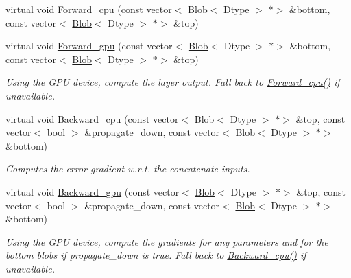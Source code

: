 \begin{DoxyCompactItemize}
virtual void \mbox{\hyperlink{classcaffe_1_1_concat_layer_ab2e03afe654f6b4240086e30ff4efdd8}{Forward\+\_\+cpu}} (const vector$<$ \mbox{\hyperlink{classcaffe_1_1_blob}{Blob}}$<$ Dtype $>$ $\ast$$>$ \&bottom, const vector$<$ \mbox{\hyperlink{classcaffe_1_1_blob}{Blob}}$<$ Dtype $>$ $\ast$$>$ \&top)
\item 
\mbox{\label{classcaffe_1_1_concat_layer_ae86c2ad93bac4790fec2c9dcfcba269c}} 
virtual void \mbox{\hyperlink{classcaffe_1_1_concat_layer_ae86c2ad93bac4790fec2c9dcfcba269c}{Forward\+\_\+gpu}} (const vector$<$ \mbox{\hyperlink{classcaffe_1_1_blob}{Blob}}$<$ Dtype $>$ $\ast$$>$ \&bottom, const vector$<$ \mbox{\hyperlink{classcaffe_1_1_blob}{Blob}}$<$ Dtype $>$ $\ast$$>$ \&top)
\begin{DoxyCompactList}\small\item\em Using the G\+PU device, compute the layer output. Fall back to \mbox{\hyperlink{classcaffe_1_1_concat_layer_a619c378faa120012f06bfc1065b89ae2}{Forward\+\_\+cpu()}} if unavailable. \end{DoxyCompactList}\item 
virtual void \mbox{\hyperlink{classcaffe_1_1_concat_layer_a55d1c2fca20df9b4e83069b303d03629}{Backward\+\_\+cpu}} (const vector$<$ \mbox{\hyperlink{classcaffe_1_1_blob}{Blob}}$<$ Dtype $>$ $\ast$$>$ \&top, const vector$<$ bool $>$ \&propagate\+\_\+down, const vector$<$ \mbox{\hyperlink{classcaffe_1_1_blob}{Blob}}$<$ Dtype $>$ $\ast$$>$ \&bottom)
\begin{DoxyCompactList}\small\item\em Computes the error gradient w.\+r.\+t. the concatenate inputs. \end{DoxyCompactList}\item 
\mbox{\label{classcaffe_1_1_concat_layer_ac26a8bdde04bc090183194972d524e09}} 
virtual void \mbox{\hyperlink{classcaffe_1_1_concat_layer_ac26a8bdde04bc090183194972d524e09}{Backward\+\_\+gpu}} (const vector$<$ \mbox{\hyperlink{classcaffe_1_1_blob}{Blob}}$<$ Dtype $>$ $\ast$$>$ \&top, const vector$<$ bool $>$ \&propagate\+\_\+down, const vector$<$ \mbox{\hyperlink{classcaffe_1_1_blob}{Blob}}$<$ Dtype $>$ $\ast$$>$ \&bottom)
\begin{DoxyCompactList}\small\item\em Using the G\+PU device, compute the gradients for any parameters and for the bottom blobs if propagate\+\_\+down is true. Fall back to \mbox{\hyperlink{classcaffe_1_1_concat_layer_a928a320b29e3f72ffcc661d00534f760}{Backward\+\_\+cpu()}} if unavailable. \end{DoxyCompactList}\end{DoxyCompactItemize}
